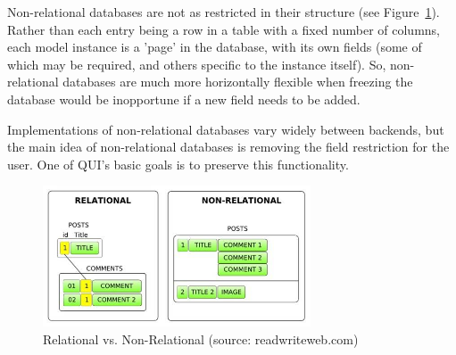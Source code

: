 \documentclass{article} %
\begin{document}
Non-relational databases are not as restricted in their structure (see Figure~\ref{fig:reltab}). Rather than each entry being a row in a table with a fixed number of 
columns, each model instance is a 'page' in the database, with its own fields (some of which may be required, and others specific to the instance itself). So, 
non-relational databases are much more horizontally flexible when freezing the database would be inopportune if a new field needs to be added.

Implementations of non-relational databases vary widely between backends, but the main idea of non-relational databases is removing the field restriction for the user.
One of QUI's basic goals is to preserve this functionality. 
\begin{figure}[htb]
\centering
\includegraphics[width=300px]{RelNonRel}
\caption{Relational vs. Non-Relational (source: readwriteweb.com) }
\label{fig:reltab}
\end{figure}
\end{document}
